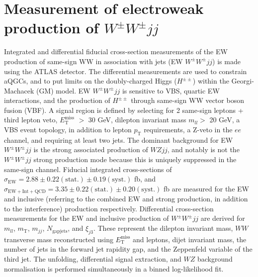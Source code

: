 \documentclass{v23windows}
\def\pt{\ensuremath{p_{\mathrm{T}}}\xspace}
\begin{document}
\section{Measurement of electroweak production of $W^\pm W^\pm jj$\label{sec:ssww}}
Integrated and differential fiducial cross-section measurements of the EW production of same-sign WW in association with jets (EW $W^\pm W^\pm jj$) is made using the ATLAS detector. The differential measurements are used to constrain aQGCs, and to put limits on the doubly-charged Higgs ($H^{\pm\pm}$) within the Georgi-Machacek (GM) model. \cite{ssww}
EW $W^\pm W^\pm jj$ is sensitive to VBS, quartic EW interactions, and the production of $H^{\pm\pm}$ through same-sign WW vector boson fusion (VBF). A signal region is defined by selecting for 2 same-sign leptons + third lepton veto, $E_\mathrm{T}^{\mathrm{miss}}$ $>$ 30 GeV, dilepton invariant mass $m_{ll}>$ 20 GeV, a VBS event topology, 
in addition to lepton \pt requirements, a Z-veto in the $ee$ channel, and requiring at least two jets. The dominant background for EW $W^\pm W^\pm jj$ is the strong associated production of $WZjj$, and notably is not the $W^\pm W^\pm jj$ strong production mode because this is uniquely suppressed in the same-sign channel. Fiducial integrated cross-sections of $\sigma_{\mathrm{EW}}=2.88\pm0.22(\mathrm{stat}.)\pm0.19(\mathrm{syst.})$ fb, and $\sigma_{\mathrm{EW+Int+QCD}}=3.35\pm0.22(\mathrm{stat}.)\pm0.20(\mathrm{syst.})$ fb are measured for the EW and inclusive (referring to the combined EW and strong production, in addition to the interference) production respectively. Differential cross-section measurements for the EW and inclusive production of $W^\pm W^\pm jj$ are derived for $m_{ll}$, $m_{\mathrm{T}}$, $m_{jj}$, $N_{\mathrm{gapjets}}$, and $\xi_{j3}$. These represent the dilepton invariant mass, $WW$ transverse mass reconstructed using $E_\mathrm{T}^{\mathrm{miss}}$ and leptons, dijet invariant mass, the number of jets in the forward jet rapidity gap, and the Zeppenfeld variable of the third jet. 
The unfolding, differential signal extraction, and $WZ$ background normalisation is performed simultaneously in a binned log-likelihood fit.\\\\
\end{document}

